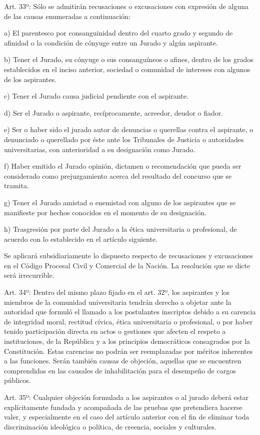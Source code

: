 \documentclass[]{article}
\begin{document}
Art. 33º: Sólo se admitirán recusaciones o excusaciones con expresión de
alguna de las causas enumeradas a continuación:

a) El parentesco por consanguinidad dentro del cuarto grado y segundo de
afinidad o la condición de cónyuge entre un Jurado y algún aspirante.

b) Tener el Jurado, su cónyuge o sus consanguíneos o afines, dentro de
los grados establecidos en el inciso anterior, sociedad o comunidad de
intereses con algunos de los aspirantes.

c) Tener el Jurado causa judicial pendiente con el aspirante.

d) Ser el Jurado o aspirante, recíprocamente, acreedor, deudor o fiador.

e) Ser o haber sido el jurado autor de denuncias o querellas contra el
aspirante, o denunciado o querellado por éste ante los Tribunales de
Justicia o autoridades universitarias, con anterioridad a su designación
como Jurado.

f) Haber emitido el Jurado opinión, dictamen o recomendación que pueda
ser considerado como prejuzgamiento acerca del resultado del concurso
que se tramita.

g) Tener el Jurado amistad o enemistad con alguno de los aspirantes que
se manifieste por hechos conocidos en el momento de su designación.

h) Trasgresión por parte del Jurado a la ética universitaria o
profesional, de acuerdo con lo establecido en el artículo siguiente.

Se aplicará subsidiariamente lo dispuesto respecto de recusaciones y
excusaciones en el Código Procesal Civil y Comercial de la Nación. La
resolución que se dicte será irrecurrible.

Art. 34º: Dentro del mismo plazo fijado en el art. 32º, los aspirantes y
los miembros de la comunidad universitaria tendrán derecho a objetar
ante la autoridad que formuló el llamado a los postulantes inscriptos
debido a su carencia de integridad moral, rectitud cívica, ética
universitaria o profesional, o por haber tenido participación directa en
actos o gestiones que afecten el respeto a instituciones, de la
República y a los principios democráticos consagrados por la
Constitución. Estas carencias no podrán ser reemplazadas por méritos
inherentes a las funciones. Serán también causas de objeción, aquellas
que se encuentren comprendidas en las causales de inhabilitación para el
desempeño de cargos públicos.

Art. 35º: Cualquier objeción formulada a los aspirantes o al jurado
deberá estar explícitamente fundada y acompañada de las pruebas que
pretendiera hacerse valer, y especialmente en el caso del artículo
anterior con el fin de eliminar toda discriminación ideológica o
política, de creencia, sociales y culturales.
\end{document}
